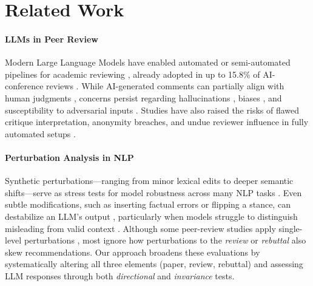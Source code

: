 \section{Related Work}
\paragraph{LLMs in Peer Review}
Modern Large Language Models have enabled automated or semi-automated pipelines for academic reviewing \citep{liang2024can, jin2024agentreview, yu2024automated}, already adopted in up to 15.8\% of AI-conference reviews \citep{liangmonitoring, latona2024ai}. While AI-generated comments can partially align with human judgments \citep{liang2024can}, concerns persist regarding hallucinations \citep{zeng2024johnny}, biases \citep{gallegos2024bias}, and susceptibility to adversarial inputs \citep{liang2024can, lu2024ai}. Studies have also raised the risks of flawed critique interpretation, anonymity breaches, and undue reviewer influence in fully automated setups \citep{ye2024we, yu2024automated}.

\paragraph{Perturbation Analysis in NLP}
Synthetic perturbations---ranging from minor lexical edits to deeper semantic shifts---serve as
stress tests for model robustness across many NLP tasks \citep{DBLP:conf/emnlp/SaiDSMK21,
DBLP:conf/acl/HeZ0KCGT23, DBLP:conf/emnlp/KarpinskaRTSGI22}. Even subtle modifications, such as
inserting factual errors or flipping a stance, can destabilize an LLM’s output
\citep{DBLP:journals/corr/abs-2312-15407, DBLP:journals/corr/abs-2305-14658}, particularly when
models struggle to distinguish misleading from valid context \citep{zeng2024johnny,
deshpande2023toxicity}. Although some peer-review studies apply single-level perturbations
\citep{ye2024we}, most ignore how perturbations to the \emph{review} or \emph{rebuttal} also skew
recommendations. Our approach broadens these evaluations by systematically altering all three
elements (paper, review, rebuttal) and assessing LLM responses through both \emph{directional}
and \emph{invariance} tests.